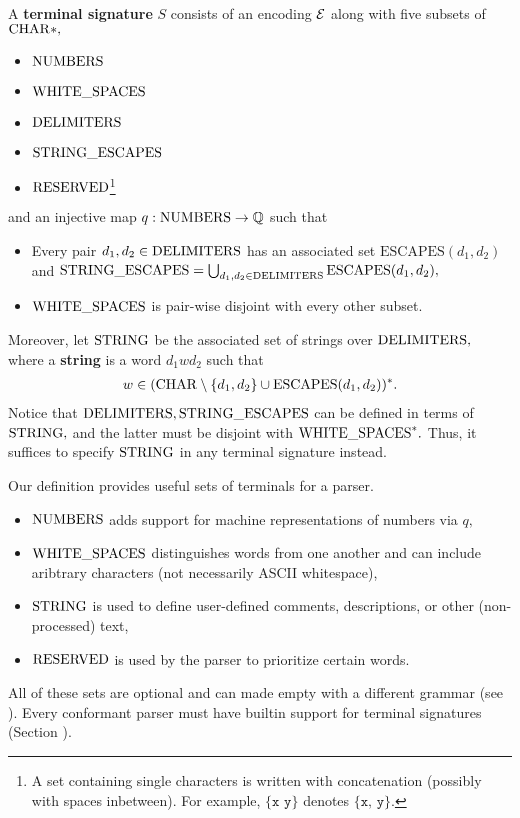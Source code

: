\begin{definition}
  A \textbf{terminal signature} $S$ consists of an encoding $\mathcal{E}$ along with five subsets of $\mathrm{CHAR}*,$
  \begin{itemize}
  \item $\mathrm{NUMBERS}$
  \item $\mathrm{WHITE\_SPACES}$
  \item $\mathrm{DELIMITERS}$
  \item $\mathrm{STRING\_ESCAPES}$
  \item $\mathrm{RESERVED}$\footnote{A set containing single characters is written with concatenation (possibly with spaces inbetween). For example, $\{\texttt{x y}\}$ denotes $\{\texttt{x, y}\}.$} %
  \end{itemize}
  and an injective map $q: \mathrm{NUMBERS} \to \mathbb{Q}$ such that
  \begin{itemize}
    \item Every pair $d_{1}, d_{2} \in \mathrm{DELIMITERS}$ has an associated set $\textrm{ESCAPES}(d_{1}, d_{2})$ and
          $\mathrm{STRING\_ESCAPES} = \bigcup_{d_{1}, d_{2} \in \mathrm{DELIMITERS}}\textrm{ESCAPES}(d_{1}, d_{2}),$
    \item $\mathrm{WHITE\_SPACES}$ is pair-wise disjoint with every other subset.
  \end{itemize}

Moreover, let $\mathrm{STRING}$ be the associated set of strings over $\mathrm{DELIMITERS},$ where a \textbf{string} is a word $d_{1}wd_{2}$ such that
\begin{align*}
w \in (\mathrm{CHAR} \setminus \{d_{1}, d_{2}\} \cup \textrm{ESCAPES}(d_{1}, d_{2}))^*.
\end{align*}
  Notice that $\mathrm{DELIMITERS}, \mathrm{STRING\_ESCAPES}$ can be defined in terms of $\mathrm{STRING},$ and the latter must be disjoint with $\mathrm{WHITE\_SPACES}^{*}.$ Thus, it suffices to specify $\mathrm{STRING}$ in any terminal signature instead.
\end{definition}

Our definition provides useful sets of terminals for a parser.
\begin{itemize}
  \item $\mathrm{NUMBERS}$ adds support for machine representations of numbers via $q,$
  \item $\mathrm{WHITE\_SPACES}$ distinguishes words from one another and can include aribtrary characters (not necessarily ASCII whitespace),
  \item $\mathrm{STRING}$ is used to define user-defined comments, descriptions, or other (non-processed) text,
  \item $\mathrm{RESERVED}$ is used by the parser to prioritize certain words.
\end{itemize}
All of these sets are optional and can made empty with a different grammar (see \label{section:customization}). Every conformant parser must have builtin support for terminal signatures (Section \label{section:conformance}).


